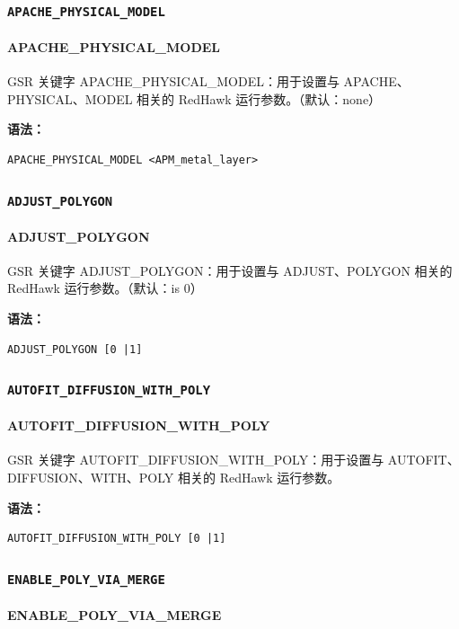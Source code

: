 \subsubsection{\texttt{APACHE_PHYSICAL_MODEL}}
\paragraph*{APACHE_PHYSICAL_MODEL}

GSR 关键字 APACHE_PHYSICAL_MODEL：用于设置与 APACHE、PHYSICAL、MODEL 相关的 RedHawk 运行参数。（默认：none）

\textbf{语法：}
\begin{lstlisting}
APACHE_PHYSICAL_MODEL <APM_metal_layer>
\end{lstlisting}

\subsubsection{\texttt{ADJUST_POLYGON}}
\paragraph*{ADJUST_POLYGON}

GSR 关键字 ADJUST_POLYGON：用于设置与 ADJUST、POLYGON 相关的 RedHawk 运行参数。（默认：is 0）

\textbf{语法：}
\begin{lstlisting}
ADJUST_POLYGON [0 |1]
\end{lstlisting}

\subsubsection{\texttt{AUTOFIT_DIFFUSION_WITH_POLY}}
\paragraph*{AUTOFIT_DIFFUSION_WITH_POLY}

GSR 关键字 AUTOFIT_DIFFUSION_WITH_POLY：用于设置与 AUTOFIT、DIFFUSION、WITH、POLY 相关的 RedHawk 运行参数。

\textbf{语法：}
\begin{lstlisting}
AUTOFIT_DIFFUSION_WITH_POLY [0 |1]
\end{lstlisting}

\subsubsection{\texttt{ENABLE_POLY_VIA_MERGE}}
\paragraph*{ENABLE_POLY_VIA_MERGE}

